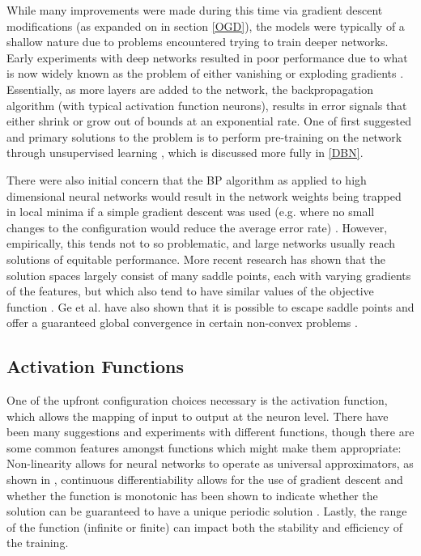 \documentclass[a4paper,latin]{paper}
\begin{document}
While many improvements were made during this time via gradient descent modifications (as expanded on in section \ref{OGD}), the 
models were typically of a shallow nature due to problems encountered trying to train deeper networks. 
Early experiments with deep networks resulted in poor performance due to what is now widely known as the problem 
of either vanishing or exploding gradients \cite{Pascanu}. Essentially, as more layers are added to the network, the backpropagation 
algorithm (with typical activation function neurons), results in error signals that either shrink or grow out of bounds at an 
exponential rate. One of first suggested and primary solutions to the problem is to perform pre-training on the 
network through unsupervised learning  \cite{Schmidhuber}, which is discussed more fully in \ref{DBN}.
\hfill \break 

There were also initial concern that the BP algorithm as applied to high dimensional neural networks would result 
in the network weights being trapped in local minima if a simple gradient descent was used (e.g. where no small 
changes to the configuration would reduce the average error rate) \cite{LeCun4}. 
However, empirically, this tends not to so problematic, and large networks usually reach solutions of equitable 
performance. More recent research has shown that the solution spaces largely consist of many saddle points, each 
with varying gradients of the features, but which also tend to have similar values of the objective function \cite{Dauphin}. 
Ge et al. have also shown that it is possible to escape saddle points and offer a guaranteed global convergence 
in certain non-convex problems \cite{Ge}.
\hfill \break 

\subsection{Activation Functions}

One of the upfront configuration choices necessary is the activation function, which allows the mapping of input 
to output at the neuron level. There have been many suggestions and experiments with different functions, though 
there are some common features amongst functions which might make them appropriate: Non-linearity allows for 
neural networks to operate as universal approximators, as shown in \cite{Hornik}, continuous differentiability allows for the 
use of gradient descent and whether the function is monotonic has been shown to indicate whether the solution 
can be guaranteed to have a unique periodic solution \cite{Wu}. Lastly, the range of the function (infinite or finite) can impact both the 
stability and efficiency of the training.
\hfill \break 
\end{document}
